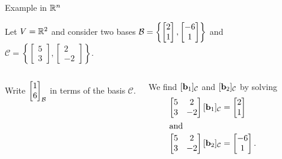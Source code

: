 \documentclass[xcolor=dvipsnames,aspectratio=169,t]{beamer}
\renewcommand{\C}{\mathcal{C}}
\begin{document}
\begin{frame}{Example in $\mathbb{R}^n$}
  \smallskip
  
  Let $V = \mathbb{R}^2$ and consider two bases $\mathcal{B} = \left\{ \begin{bmatrix} 2 \\ 1 \end{bmatrix}, \begin{bmatrix} -6 \\ 1 \end{bmatrix} \right\}$ and $\C = \left\{ \begin{bmatrix} 5 \\ 3 \end{bmatrix}, \begin{bmatrix} 2 \\ -2 \end{bmatrix} \right\}$.
  
  \begin{columns}
  Write $\begin{bmatrix} 1 \\ 6 \end{bmatrix}_{\mathcal{B}}$ in terms of the basis $\C$.
  \bigskip
  
  \pause
  We find $[\b_1]_\C$ and $[\b_2]_\C$ by solving
  \begin{align*}
    \begin{bmatrix} 5 & 2 \\ 3 & -2 \end{bmatrix} [\b_1]_\C 
    &= \begin{bmatrix} 2 \\ 1 \end{bmatrix}\\
  \intertext{and}
    \begin{bmatrix} 5 & 2 \\ 3 & -2 \end{bmatrix} [\b_2]_\C 
    &= \begin{bmatrix} -6 \\ 1 \end{bmatrix}.
  \end{align*}

  \vspace*{.5em}
  

\end{columns}
\end{frame}
\end{document}
